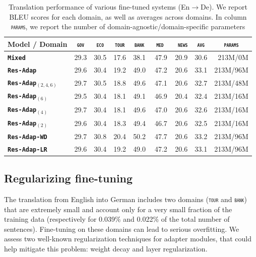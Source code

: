 \documentclass[11pt,a4paper]{article}
\newcommand{\fyDone}[1]{\done[FY]\Todo[FY:]{\textcolor{orange}{#1}}}
\newcommand{\domain}[1]{\texttt{\textsc{#1}}}
\newcommand{\system}[1]{\texttt{\textbf{#1}}}
\begin{document}
\begin{table}[htbp]
  \centering
  \fyDone{Fix column size}
  \begin{tabular}{|p{3cm}|*{8}{r|}} \hline
    Model / Domain & \multicolumn{1}{c|}{\domain{gov}} & \multicolumn{1}{c|}{\domain{eco}} & \multicolumn{1}{c|}{\domain{tour}} & \multicolumn{1}{c|}{\domain{bank}} & \multicolumn{1}{c|}{\domain{ med }} & \multicolumn{1}{c|}{\domain{ news}} & \multicolumn{1}{c|}{\domain{avg}} & \multicolumn{1}{c|}{\domain{params}} \\ \hline
    \system{Mixed}          & 29.3 & 30.5 & 17.6 & 38.1 & 47.9 & 20.9  & 30.6 & 213M/0M\\
   \system{Res-Adap}     & 29.6 & 30.4 & 19.2 & 49.0 & 47.2 & 20.6 & 33.1 & 213M/96M \\ \hline
    \system{Res-Adap$_{(2,4,6)}$} & 29.7  & 30.5 & 18.8 & 49.6 & 47.1 & 20.6 &  32.7 & 213M/48M \\ 
    \system{Res-Adap$_{(6)}$}      & 29.5 & 30.4 & 18.1 & 49.1 & 46.9 & 20.4 & 32.4 & 213M/16M \\
   \system{Res-Adap$_{(4)}$}       & 29.7 & 30.4 & 18.1 & 49.6 & 47.0 & 20.6 & 32.6 & 213M/16M\\
   \system{Res-Adap$_{(2)}$}       & 29.6 & 30.4 & 18.3 & 49.4 & 46.7 & 20.6 & 32.5  & 213M/16M\\
   \hline
    \system{Res-Adap-WD}         & 29.7 & 30.8 & 20.4 & 50.2 & 47.7 & 20.6 & 33.2 & 213M/96M \\
    \system{Res-Adap-LR}           & 29.6 & 30.4 & 19.2 & 49.0 & 47.2 & 20.6 & 33.1  & 213M/96M\\
    \hline
  \end{tabular}
  \caption{Translation performance of various fine-tuned systems (En$\rightarrow$De). We report BLEU scores for each domain, as well as averages across domains. In column \domain{params}, we report the number of domain-agnostic/domain-specific parameters}
  \label{tab:performance-en-de-pos-reg}
\end{table}

\subsection{Regularizing fine-tuning \label{ssec:regularization-exp}}

The translation from English into German includes two domains (\domain{tour} and \domain{bank}) that are extremely small and account only for a very small fraction of the training data (respectively for 0.039\% and 0.022\% of the total number of sentences). Fine-tuning on these domains can lead to serious overfitting. We assess two well-known regularization techniques for adapter modules, that could help mitigate this problem: weight decay and layer regularization. 
\end{document}
